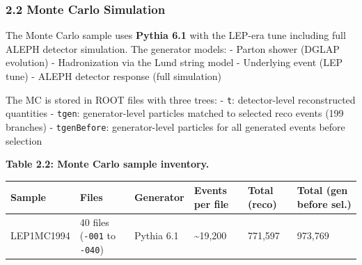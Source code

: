 \documentclass[11pt,]{article}
\begin{document}
\hypertarget{monte-carlo-simulation}{%
\subsubsection{2.2 Monte Carlo
Simulation}\label{monte-carlo-simulation}}

The Monte Carlo sample uses \textbf{Pythia 6.1} with the LEP-era tune
including full ALEPH detector simulation. The generator models: - Parton
shower (DGLAP evolution) - Hadronization via the Lund string model -
Underlying event (LEP tune) - ALEPH detector response (full simulation)

The MC is stored in ROOT files with three trees: - \texttt{t}:
detector-level reconstructed quantities - \texttt{tgen}: generator-level
particles matched to selected reco events (199 branches) -
\texttt{tgenBefore}: generator-level particles for all generated events
before selection

\textbf{Table 2.2: Monte Carlo sample inventory.}

\begin{longtable}[]{@{}llllll@{}}
\toprule
Sample & Files & Generator & Events per file & Total (reco) & Total (gen
before sel.)\tabularnewline
\midrule
\endhead
LEP1MC1994 & 40 files (\texttt{-001} to \texttt{-040}) & Pythia 6.1 &
\textasciitilde{}19,200 & 771,597 & 973,769\tabularnewline
\bottomrule
\end{longtable}
\end{document}
